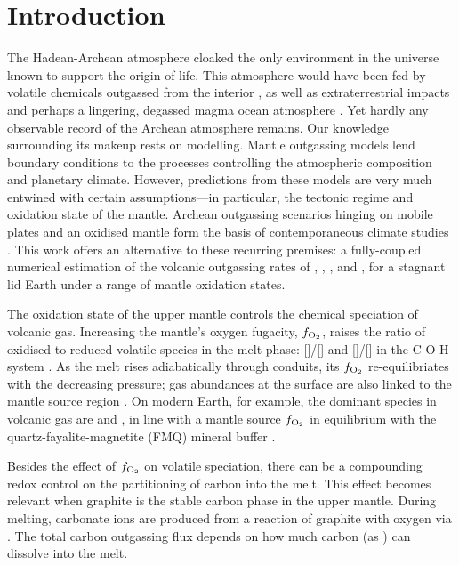 \section{Introduction}

The Hadean-Archean atmosphere cloaked the only environment in the universe known to support the origin of life. This atmosphere would have been fed by volatile chemicals outgassed from the interior \citep{Holland1984, kasting_mantle_1993, gaillard_theoretical_2014}, as well as extraterrestrial impacts \citep{Zahnle2020} and perhaps a lingering, degassed magma ocean atmosphere \citep{katyal_effect_2020}. Yet hardly any observable record of the Archean atmosphere remains. Our knowledge surrounding its makeup rests on modelling. Mantle outgassing models lend boundary conditions to the processes controlling the atmospheric composition and planetary climate. However, predictions from these models are very much entwined with certain assumptions---in particular, the tectonic regime and oxidation state of the mantle. Archean outgassing scenarios hinging on mobile plates and an oxidised mantle form the basis of contemporaneous climate studies \citep[e.g.,][]{Sleep2001}. This work offers an alternative to these recurring premises: a fully-coupled numerical estimation of the volcanic outgassing rates of , , , and , for a stagnant lid Earth under a range of mantle oxidation states. 

The oxidation state of the upper mantle controls the chemical speciation of volcanic gas. Increasing the mantle's oxygen fugacity, $f_{\rm O_2}$, raises the ratio of oxidised to reduced volatile species in the melt phase: []/[] and []/[] in the C-O-H system \citep{Holland1984}. As the melt rises adiabatically through conduits, its $f_{\rm O_2}$ re-equilibriates with the decreasing pressure; gas abundances at the surface are also linked to the mantle source region \citep{kasting_mantle_1993}. On modern Earth, for example, the dominant species in volcanic gas are  and , in line with a mantle source $f_{\rm{O_2}}$ in equilibrium with the quartz-fayalite-magnetite (FMQ) mineral buffer \citep{Holland1984}. 

Besides the effect of $f_{\rm{O_2}}$ on volatile speciation, there can be a compounding redox control on the partitioning of carbon into the melt. This effect becomes relevant when graphite is the stable carbon phase in the upper mantle. During melting, carbonate ions are produced from a reaction of graphite with oxygen via  \citep{holloway_highpressure_1992}. The total carbon outgassing flux depends on how much carbon (as ) can dissolve into the melt. 

